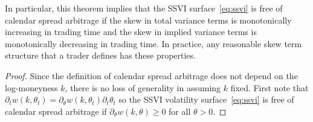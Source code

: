 \documentclass[12pt]{article}
\numberwithin{equation}{section}
\begin{document}
In particular, this theorem implies that the SSVI surface~\eqref{eq:ssvi} 
is free of calendar spread arbitrage if the skew in total variance terms is
monotonically increasing in trading time and the skew in implied variance terms is monotonically decreasing in trading time.
In practice, any reasonable skew term structure that a trader defines has these properties.



\begin{proof}
Since the definition of calendar spread arbitrage does not depend on the log-moneyness $k$,
there is no loss of generality in assuming $k$ fixed.
First note that
$\partial_t w(k,\theta_t)=\partial_\theta w(k,\theta_t)\partial_t \theta_t$
so the SSVI volatility surface~\eqref{eq:ssvi} is free of calendar spread arbitrage if
$\partial_\theta w(k,\theta) \geq 0$ for all $\theta>0$.



\end{proof}
\end{document}
